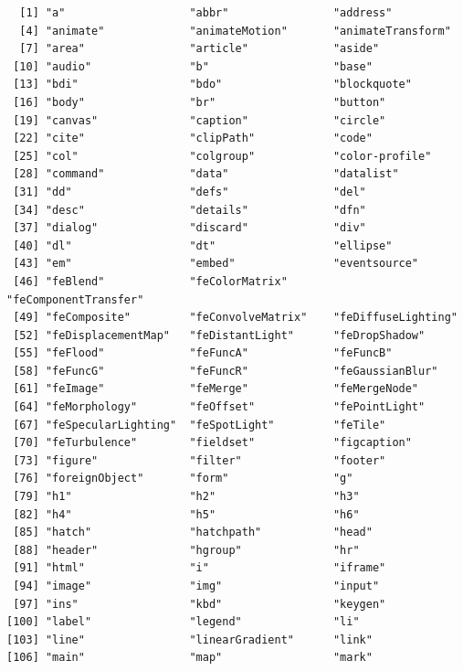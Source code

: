 \documentclass[
  letterpaper,
  DIV=11,
  numbers=noendperiod]{scrreprt}
\begin{document}
\begin{verbatim}
  [1] "a"                   "abbr"                "address"            
  [4] "animate"             "animateMotion"       "animateTransform"   
  [7] "area"                "article"             "aside"              
 [10] "audio"               "b"                   "base"               
 [13] "bdi"                 "bdo"                 "blockquote"         
 [16] "body"                "br"                  "button"             
 [19] "canvas"              "caption"             "circle"             
 [22] "cite"                "clipPath"            "code"               
 [25] "col"                 "colgroup"            "color-profile"      
 [28] "command"             "data"                "datalist"           
 [31] "dd"                  "defs"                "del"                
 [34] "desc"                "details"             "dfn"                
 [37] "dialog"              "discard"             "div"                
 [40] "dl"                  "dt"                  "ellipse"            
 [43] "em"                  "embed"               "eventsource"        
 [46] "feBlend"             "feColorMatrix"       "feComponentTransfer"
 [49] "feComposite"         "feConvolveMatrix"    "feDiffuseLighting"  
 [52] "feDisplacementMap"   "feDistantLight"      "feDropShadow"       
 [55] "feFlood"             "feFuncA"             "feFuncB"            
 [58] "feFuncG"             "feFuncR"             "feGaussianBlur"     
 [61] "feImage"             "feMerge"             "feMergeNode"        
 [64] "feMorphology"        "feOffset"            "fePointLight"       
 [67] "feSpecularLighting"  "feSpotLight"         "feTile"             
 [70] "feTurbulence"        "fieldset"            "figcaption"         
 [73] "figure"              "filter"              "footer"             
 [76] "foreignObject"       "form"                "g"                  
 [79] "h1"                  "h2"                  "h3"                 
 [82] "h4"                  "h5"                  "h6"                 
 [85] "hatch"               "hatchpath"           "head"               
 [88] "header"              "hgroup"              "hr"                 
 [91] "html"                "i"                   "iframe"             
 [94] "image"               "img"                 "input"              
 [97] "ins"                 "kbd"                 "keygen"             
[100] "label"               "legend"              "li"                 
[103] "line"                "linearGradient"      "link"               
[106] "main"                "map"                 "mark"               

\end{verbatim}
\end{document}

